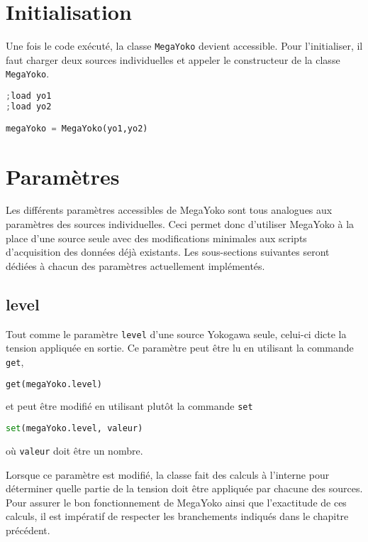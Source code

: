 \documentclass[openright,letterpaper,12pt]{book}
\begin{document}

\section*{Initialisation}
Une fois le code exécuté, la classe \verb+MegaYoko+ devient accessible. 
Pour l'initialiser, il faut charger deux sources individuelles et appeler le 
constructeur de la classe \verb+MegaYoko+.
\begin{lstlisting}[language=Python]
;load yo1
;load yo2

megaYoko = MegaYoko(yo1,yo2)
\end{lstlisting}

\section*{Paramètres}
Les différents paramètres accessibles de MegaYoko sont tous analogues aux 
paramètres des sources individuelles. 
Ceci permet donc d'utiliser MegaYoko à la place d'une source seule avec des 
modifications minimales aux scripts d'acquisition des données déjà existants. 
Les sous-sections suivantes seront dédiées à chacun des paramètres actuellement 
implémentés.

\subsection*{level}
Tout comme le paramètre \verb+level+ d'une source Yokogawa seule, celui-ci 
dicte la tension appliquée en sortie. 
Ce paramètre peut être lu en utilisant la commande \verb+get+,
\begin{lstlisting}[language=Python]
get(megaYoko.level)
\end{lstlisting}
et peut être modifié en utilisant plutôt la commande \verb+set+
\begin{lstlisting}[language=Python]
set(megaYoko.level, valeur)
\end{lstlisting}
où \verb+valeur+ doit être un nombre. 

\vspace{0.5cm}
Lorsque ce paramètre est modifié, la classe fait des calculs à l'interne pour 
déterminer quelle partie de la tension doit être appliquée par chacune des 
sources. 
Pour assurer le bon fonctionnement de MegaYoko ainsi que l'exactitude de ces 
calculs, il est impératif de respecter les branchements indiqués dans le 
chapitre précédent.
\end{document}
